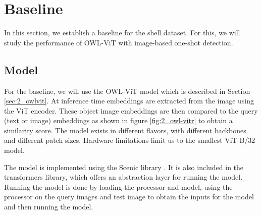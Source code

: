 \section{Baseline}
In this section, we establish a baseline for the shell dataset. For this, we will study the performance of OWL-ViT with image-based one-shot detection. 

\subsection{Model}
For the baseline, we will use the OWL-ViT model which is described in Section \ref*{sec:2_owlvit}. At inference time embeddings are extracted from the image using the ViT encoder. These object image embeddings are then compared to the query (text or image) embeddings as shown in figure \ref{fig:2_owl-vitr} to obtain a similarity score. The model exists in different flavors, with different backbones and different patch sizes. Hardware limitations limit us to the smallest ViT-B/32 model.

The model is implemented using the Scenic library \citep{scenic}. 
It is also included in the transformers library, which offers an abstraction layer for running the model. Running the model is done by loading the processor and model, using the processor on the query images and test image to obtain the inputs for the model and then running the model.

